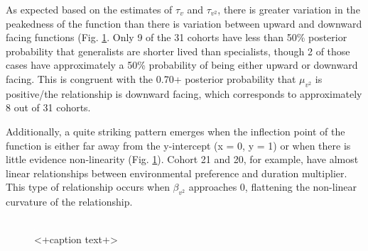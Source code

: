\documentclass[12pt,letterpaper]{article}
\begin{document}
As expected based on the estimates of \(\tau_{v}\) and \(\tau_{v^{2}}\), there is greater variation in the peakedness of the function than there is variation between upward and downward facing functions (Fig. \ref{fig:env_cohort}. Only 9 of the 31 cohorts have less than 50\% posterior probability that generalists are shorter lived than specialists, though 2 of those cases have approximately a 50\% probability of being either upward or downward facing. This is congruent with the 0.70+ posterior probability that \(\mu_{v^{2}}\) is positive/the relationship is downward facing, which corresponds to approximately 8 out of 31 cohorts.

Additionally, a quite striking pattern emerges when the inflection point of the function is either far away from the y-intercept (x = 0, y = 1) or when there is little evidence non-linearity (Fig. \ref{fig:env_cohort}). Cohort 21 and 20, for example, have almost linear relationships between environmental preference and duration multiplier. This type of relationship occurs when \(\beta_{v^{2}}\) approaches 0, flattening the non-linear curvature of the relationship.

\begin{figure}
  \centering
  \includegraphics[height = 0.5\textheight,width=\textwidth,keepaspectratio=true]{figure/cohort_quads}
  \caption{<+caption text+>}
  \label{fig:env_cohort}
\end{figure}
\end{document}
